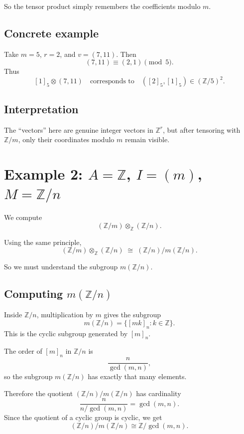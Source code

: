 \documentclass[12pt,a4paper]{article}
\theoremstyle{plain}
\theoremstyle{definition}      %
\begin{document}
	So the tensor product simply remembers the coefficients modulo \(m\).
	
	\subsection{Concrete example}
	
	Take \(m=5\), \(r=2\), and \(v=(7,11)\). Then
	\[
	(7,11)\equiv (2,1)\pmod 5.
	\]
	Thus
	\[
	[1]_5\otimes (7,11)
	\quad\text{corresponds to}\quad
	([2]_5,[1]_5)\in (\mathbb Z/5)^2.
	\]
	
	\subsection{Interpretation}
	
	The ``vectors'' here are genuine integer vectors in \(\mathbb Z^r\), but after tensoring with \(\mathbb Z/m\), only their coordinates modulo \(m\) remain visible.
	
	\section{Example 2: \texorpdfstring{$A=\mathbb Z$, $I=(m)$, $M=\mathbb Z/n$}{A=Z, I=(m), M=Z/n}}
	
	We compute
	\[
	(\mathbb Z/m)\otimes_{\mathbb Z}(\mathbb Z/n).
	\]
	
	Using the same principle,
	\[
	(\mathbb Z/m)\otimes_{\mathbb Z}(\mathbb Z/n)
	\;\cong\;
	(\mathbb Z/n)/m(\mathbb Z/n).
	\]
	
	So we must understand the subgroup \(m(\mathbb Z/n)\).
	
	\subsection{Computing \texorpdfstring{$m(\mathbb Z/n)$}{m(Z/n)}}
	
	Inside \(\mathbb Z/n\), multiplication by \(m\) gives the subgroup
	\[
	m(\mathbb Z/n)
	=
	\{[mk]_n : k\in\mathbb Z\}.
	\]
	This is the cyclic subgroup generated by \([m]_n\).
	
	The order of \([m]_n\) in \(\mathbb Z/n\) is
	\[
	\frac{n}{\gcd(m,n)},
	\]
	so the subgroup \(m(\mathbb Z/n)\) has exactly that many elements.
	
	Therefore the quotient \((\mathbb Z/n)/m(\mathbb Z/n)\) has cardinality
	\[
	\frac{n}{n/\gcd(m,n)}=\gcd(m,n).
	\]
	Since the quotient of a cyclic group is cyclic, we get
	\[
	(\mathbb Z/n)/m(\mathbb Z/n)\cong \mathbb Z/\gcd(m,n).
	\]
	
\end{document}
